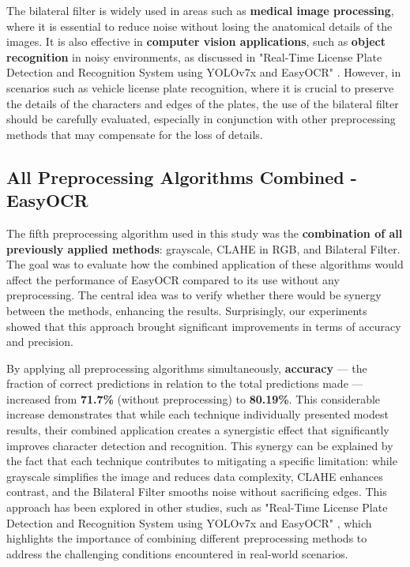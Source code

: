 \documentclass[conference]{IEEEtran}
\begin{document}
	The bilateral filter is widely used in areas such as \textbf{medical image processing}, where it is essential to reduce noise without losing the anatomical details of the images. It is also effective in \textbf{computer vision applications}, such as \textbf{object recognition} in noisy environments, as discussed in "Real-Time License Plate Detection and Recognition System using YOLOv7x and EasyOCR" \cite{b2}. However, in scenarios such as vehicle license plate recognition, where it is crucial to preserve the details of the characters and edges of the plates, the use of the bilateral filter should be carefully evaluated, especially in conjunction with other preprocessing methods that may compensate for the loss of details.
	
	\subsection{All Preprocessing Algorithms Combined - EasyOCR}
	
	The fifth preprocessing algorithm used in this study was the \textbf{combination of all previously applied methods}: grayscale, CLAHE in RGB, and Bilateral Filter. The goal was to evaluate how the combined application of these algorithms would affect the performance of EasyOCR compared to its use without any preprocessing. The central idea was to verify whether there would be synergy between the methods, enhancing the results. Surprisingly, our experiments showed that this approach brought significant improvements in terms of accuracy and precision.
	
	By applying all preprocessing algorithms simultaneously, \textbf{accuracy} — the fraction of correct predictions in relation to the total predictions made — increased from \textbf{71.7\%} (without preprocessing) to \textbf{80.19\%}. This considerable increase demonstrates that while each technique individually presented modest results, their combined application creates a synergistic effect that significantly improves character detection and recognition. This synergy can be explained by the fact that each technique contributes to mitigating a specific limitation: while grayscale simplifies the image and reduces data complexity, CLAHE enhances contrast, and the Bilateral Filter smooths noise without sacrificing edges. This approach has been explored in other studies, such as "Real-Time License Plate Detection and Recognition System using YOLOv7x and EasyOCR" \cite{b2}, which highlights the importance of combining different preprocessing methods to address the challenging conditions encountered in real-world scenarios.
	
\end{document}
